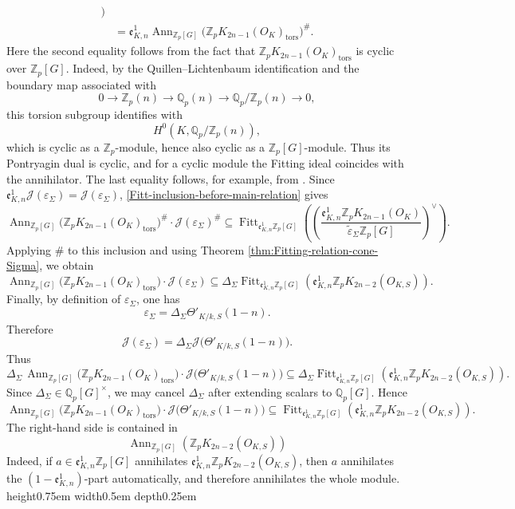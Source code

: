 \documentclass[a4paper,11pt]{article}
\newenvironment{proof}[1][Proof]{\begin{trivlist}
\item[\hskip \labelsep {\bfseries #1}]}{\end{trivlist}}
\newcommand{\qed}{\nobreak \ifvmode \relax \else
    \ifdim\lastskip<1.5em \hskip-\lastskip
     \hskip1.5em plus0em minus0.5em \fi \nobreak
      \vrule height0.75em width0.5em depth0.25em\fi}
\begin{document}
\begin{proof}
\begin{align*}
\bigr)
\\
& =
\mathfrak e^1_{K,n}
\operatorname{Ann}_{\mathbb Z_p[G]}
\bigl(
\mathbb Z_pK_{2n-1}(O_K)_{\mathrm{tors}}
\bigr)^\#.
\end{align*}
Here the second equality follows from the fact that
\(\mathbb Z_pK_{2n-1}(O_K)_{\mathrm{tors}}\) is cyclic over
\(\mathbb Z_p[G]\). Indeed, by the Quillen--Lichtenbaum identification and the
boundary map associated with
\[
0\to \mathbb Z_p(n)\to \mathbb Q_p(n)\to
\mathbb Q_p/\mathbb Z_p(n)\to 0,
\]
this torsion subgroup identifies with
\[
H^0(K,\mathbb Q_p/\mathbb Z_p(n)),
\]
which is cyclic as a \(\mathbb Z_p\)-module, hence also cyclic as a
\(\mathbb Z_p[G]\)-module. Thus its Pontryagin dual is cyclic, and for a cyclic
module the Fitting ideal coincides with the annihilator. The last equality
follows, for example, from \cite[Lemma 3.1(ii)]{Popescu}. Since
\(\mathfrak e^1_{K,n}\mathcal J(\varepsilon_\Sigma)=\mathcal J(\varepsilon_\Sigma)\),
\eqref{Fitt-inclusion-before-main-relation} gives
\[
\operatorname{Ann}_{\mathbb Z_p[G]}
\bigl(
\mathbb Z_pK_{2n-1}(O_K)_{\mathrm{tors}}
\bigr)^\#
\cdot
\mathcal J(\varepsilon_\Sigma)^\#
\subseteq
\operatorname{Fitt}_{\mathfrak e^1_{K,n}\mathbb Z_p[G]}
\left(
\left(
\frac{
\mathfrak e^1_{K,n}\mathbb Z_pK_{2n-1}(O_K)
}{
\widetilde\varepsilon_{\Sigma}\mathbb Z_p[G]
}
\right)^\vee
\right).
\]
Applying \(\#\) to this inclusion and using
Theorem \ref{thm:Fitting-relation-cone-Sigma}, we obtain
\[
\operatorname{Ann}_{\mathbb Z_p[G]}
\bigl(
\mathbb Z_pK_{2n-1}(O_K)_{\mathrm{tors}}
\bigr)
\cdot
\mathcal J(\varepsilon_\Sigma)
\subseteq
\Delta_{\Sigma}
\operatorname{Fitt}_{\mathfrak e^1_{K,n}\mathbb Z_p[G]}
\left(
\mathfrak e^1_{K,n}\mathbb Z_pK_{2n-2}(O_{K,S})
\right).
\]
Finally, by definition of \(\varepsilon_\Sigma\), one has
\[
\varepsilon_\Sigma
=
\Delta_\Sigma\Theta'_{K/k,S}(1-n).
\]
Therefore
\[
\mathcal J(\varepsilon_\Sigma)
=
\Delta_\Sigma
\mathcal J\bigl(\Theta'_{K/k,S}(1-n)\bigr).
\]
Thus
\[
\Delta_\Sigma\,
\operatorname{Ann}_{\mathbb Z_p[G]}
\bigl(
\mathbb Z_pK_{2n-1}(O_K)_{\mathrm{tors}}
\bigr)
\cdot
\mathcal J\bigl(\Theta'_{K/k,S}(1-n)\bigr)
\subseteq
\Delta_{\Sigma}
\operatorname{Fitt}_{\mathfrak e^1_{K,n}\mathbb Z_p[G]}
\left(
\mathfrak e^1_{K,n}\mathbb Z_pK_{2n-2}(O_{K,S})
\right).
\]
Since \(\Delta_\Sigma\in\mathbb Q_p[G]^\times\), we may cancel
\(\Delta_\Sigma\) after extending scalars to \(\mathbb Q_p[G]\). Hence
\[
\operatorname{Ann}_{\mathbb Z_p[G]}
\bigl(
\mathbb Z_pK_{2n-1}(O_K)_{\mathrm{tors}}
\bigr)
\cdot
\mathcal J\bigl(\Theta'_{K/k,S}(1-n)\bigr)
\subseteq
\operatorname{Fitt}_{\mathfrak e^1_{K,n}\mathbb Z_p[G]}
\left(
\mathfrak e^1_{K,n}\mathbb Z_pK_{2n-2}(O_{K,S})
\right).
\]
The right-hand side is contained in
\[
\operatorname{Ann}_{\mathbb Z_p[G]}
\left(
\mathbb Z_pK_{2n-2}(O_{K,S})
\right)
\]
Indeed, if
\(a\in \mathfrak e^1_{K,n}\mathbb Z_p[G]\) annihilates
\(\mathfrak e^1_{K,n}\mathbb Z_pK_{2n-2}(O_{K,S})\), then \(a\) annihilates
the \((1-\mathfrak e^1_{K,n})\)-part automatically, and therefore annihilates
the whole module.\qed
\end{proof}
\end{document}
